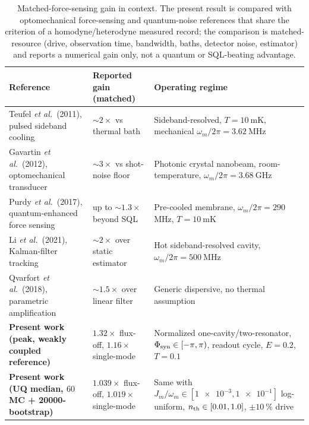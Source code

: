 \documentclass[Phys]{SciPost}
\begin{document}
\begin{table}[ht]
  \centering
  \caption{Matched-force-sensing gain in context. The present result is compared with optomechanical force-sensing and quantum-noise references that share the criterion of a homodyne/heterodyne measured record; the comparison is matched-resource (drive, observation time, bandwidth, baths, detector noise, estimator) and reports a numerical gain only, not a quantum or SQL-beating advantage.}
  \label{tab:context-comparison}
  \begin{tabular}{@{}p{}p{}p{}@{}}
    \toprule
    Reference & Reported gain (matched) & Operating regime \\
    \midrule
    Teufel \emph{et al.}~(2011), pulsed sideband cooling & $\sim\num{2}\times$ vs thermal bath & Sideband-resolved, $T=\num{10}~$\si{\milli\kelvin}, mechanical $\omega_m/2\pi=\num{3.62}~$\si{\mega\hertz} \\
    Gavartin \emph{et al.}~(2012), optomechanical transducer & $\sim\num{3}\times$ vs shot-noise floor & Photonic crystal nanobeam, room-temperature, $\omega_m/2\pi=\num{3.68}~$\si{\giga\hertz} \\
    Purdy \emph{et al.}~(2017), quantum-enhanced force sensing & up to $\sim\num{1.3}\times$ beyond SQL & Pre-cooled membrane, $\omega_m/2\pi=\num{290}~$\si{\mega\hertz}, $T=\num{10}~$\si{\milli\kelvin} \\
    Li \emph{et al.}~(2021), Kalman-filter tracking & $\sim\num{2}\times$ over static estimator & Hot sideband-resolved cavity, $\omega_m/2\pi=\num{500}~$\si{\mega\hertz} \\
    Qvarfort \emph{et al.}~(2018), parametric amplification & $\sim\num{1.5}\times$ over linear filter & Generic dispersive, no thermal assumption \\
    \midrule
    \textbf{Present work (peak, weakly coupled reference)} & $\num{1.32}\times$ flux-off, $\num{1.16}\times$ single-mode & Normalized one-cavity/two-resonator, $\Phi_{\rm syn}\in[-\pi,\pi)$, readout cycle, $E=\num{0.2}$, $T=\num{0.1}$ \\
    \textbf{Present work (UQ median, $\num{60}$ MC + \num{20000}-bootstrap)} & $\num{1.039}\times$ flux-off, $\num{1.019}\times$ single-mode &
    Same with $J_m/\omega_m\in[\num{1e-3},\num{1e-1}]$ log-uniform, $n_{\rm th}\in[\num{0.01},\num{1.0}]$, $\pm\qty{10}{\percent}$ drive \\
    \bottomrule
  \end{tabular}
\end{table}
\end{document}

